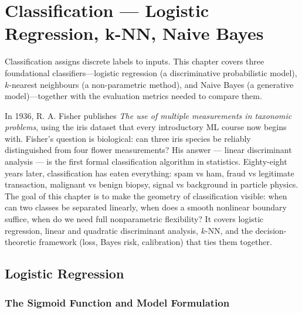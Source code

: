 \chapter{Classification --- Logistic Regression, k-NN, Naive Bayes}\label{ch:classification}

\begin{intuition}[title=\textbf{Chapter Overview}]
Classification assigns discrete labels to inputs. This chapter covers three foundational classifiers---logistic regression (a discriminative probabilistic model), $k$-nearest neighbours (a non-parametric method), and Naive Bayes (a generative model)---together with the evaluation metrics needed to compare them.
\end{intuition}

In 1936, R. A. Fisher publishes \emph{The use of multiple measurements in taxonomic problems}, using the iris dataset that every introductory ML course now begins with. Fisher's question is biological: can three iris species be reliably distinguished from four flower measurements? His answer --- linear discriminant analysis --- is the first formal classification algorithm in statistics. Eighty-eight years later, classification has eaten everything: spam vs ham, fraud vs legitimate transaction, malignant vs benign biopsy, signal vs background in particle physics. The goal of this chapter is to make the geometry of classification visible: when can two classes be separated linearly, when does a smooth nonlinear boundary suffice, when do we need full nonparametric flexibility? It covers logistic regression, linear and quadratic discriminant analysis, $k$-NN, and the decision-theoretic framework (loss, Bayes risk, calibration) that ties them together.

\section{Logistic Regression}

\subsection{The Sigmoid Function and Model Formulation}

